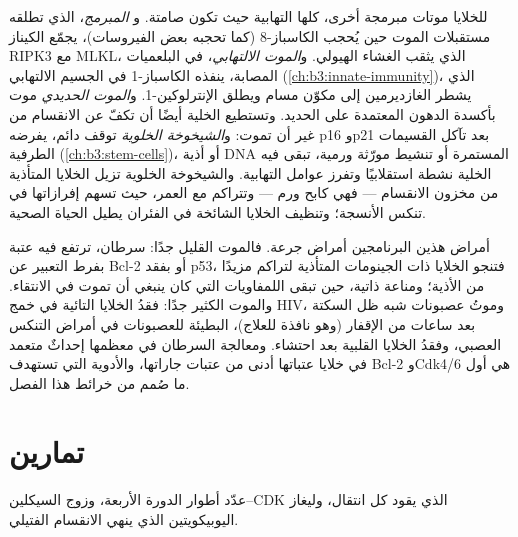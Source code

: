 \begin{definition}\label{def:b3:cell-cycle-apoptosis:other}
للخلايا موتات مبرمجة أخرى، كلها التهابية حيث تكون 
صامتة. و\emph{ المبرمج}، الذي تطلقه مستقبلات الموت حين
يُحجب الكاسباز-8 (كما تحجبه بعض الفيروسات)، يجمّع الكيناز
RIPK3 مع MLKL، الذي يثقب الغشاء الهيولي. و\emph{الموت الالتهابي}،
في البلعميات المصابة، ينفذه الكاسباز-1 في الجسيم الالتهابي
(\cref{ch:b3:innate-immunity})، الذي يشطر الغازديرمين إلى
مكوّن مسام ويطلق الإنترلوكين-1. و\emph{الموت الحديدي} موت
بأكسدة الدهون المعتمدة على الحديد. وتستطيع الخلية أيضًا أن تكفّ عن الانقسام
من غير أن تموت: و\emph{الشيخوخة الخلوية} توقف دائم، يفرضه p16
وp21 بعد تآكل القسيمات الطرفية (\cref{ch:b3:stem-cells})، أو أذية DNA
المستمرة أو تنشيط مورّثة ورمية، تبقى فيه الخلية نشطة استقلابيًا
وتفرز عوامل التهابية. والشيخوخة الخلوية تزيل الخلايا المتأذية
من مخزون الانقسام --- فهي كابح ورم --- وتتراكم
مع العمر، حيث تسهم إفرازاتها في تنكس
الأنسجة؛ وتنظيف الخلايا الشائخة في الفئران يطيل الحياة الصحية.
\end{definition}

\begin{remark}\label{rem:b3:cell-cycle-apoptosis:disease}
أمراض هذين البرنامجين أمراض جرعة. فالموت القليل جدًا:
سرطان، ترتفع فيه عتبة  بفرط التعبير عن Bcl-2
أو بفقد p53، فتنجو الخلايا ذات الجينومات المتأذية
لتراكم مزيدًا من الأذية؛ ومناعة ذاتية، حين تبقى اللمفاويات التي
كان ينبغي أن تموت في الانتقاء. والموت الكثير جدًا: فقدُ الخلايا التائية في
خمج HIV، وموتُ عصبونات شبه ظل السكتة  بعد ساعات
من الإقفار (وهو نافذة للعلاج)،  البطيئة
للعصبونات في أمراض التنكس العصبي، وفقدُ الخلايا القلبية بعد
احتشاء. ومعالجة السرطان في معظمها إحداثٌ متعمد
 في خلايا عتباتها أدنى من عتبات جاراتها،
والأدوية التي تستهدف Bcl-2 وCdk4/6 هي أول ما صُمم
من خرائط هذا الفصل.
\end{remark}

\section{تمارين}

\begin{exercise}[$\star$]\label{exo:b3:cell-cycle-apoptosis:1}
عدّد أطوار الدورة الأربعة، وزوج السيكلين--CDK الذي يقود
كل انتقال، وليغاز اليوبيكويتين الذي ينهي الانقسام الفتيلي.
\end{exercise}

